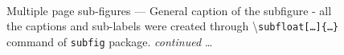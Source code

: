 \documentclass[phd,showgrids]{ndsu-thesis-2022}
\newcommand\cmd[1]{\textbackslash\texttt{#1}}  %
\begin{document}
\begin{figure}[H]
\hspace{0.5in}
\\
\captionsetup{singlelinecheck=false} %
\caption{Multiple page sub-figures --- General caption of the subfigure - all the captions and sub-labels were created through \cmd{subfloat[\ldots]\{\ldots\}} command of \texttt{subfig} package. \emph{continued} \ldots} \label{fig:1gen}
\end{figure}
\clearpage
\end{document}
